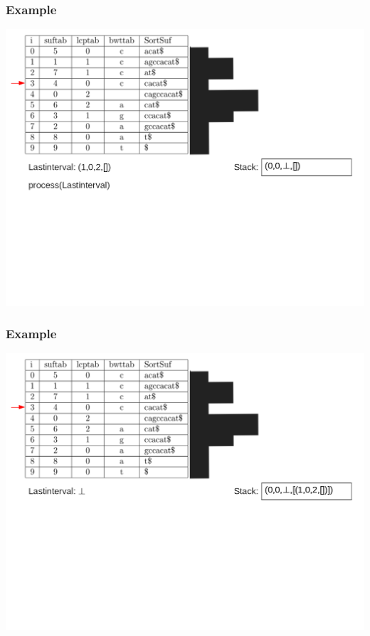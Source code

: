 \documentclass[compress,handout]{beamer} %
\begin{document}
\begin{frame}
	\frametitle{Example}
	\includegraphics[width=\textwidth, height=\textheight, keepaspectratio=true]{traversal_5}
\end{frame}

\begin{frame}
	\frametitle{Example}
	\includegraphics[width=\textwidth, height=\textheight, keepaspectratio=true]{traversal_6}
\end{frame}
\end{document}

